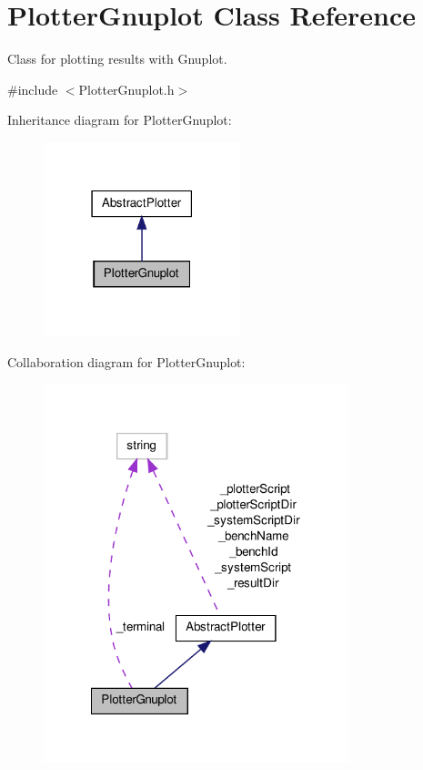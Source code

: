 \hypertarget{classPlotterGnuplot}{\section{Plotter\-Gnuplot Class Reference}
\label{classPlotterGnuplot}
}


Class for plotting results with Gnuplot.  




{\ttfamily \#include $<$Plotter\-Gnuplot.\-h$>$}



Inheritance diagram for Plotter\-Gnuplot\-:\nopagebreak
\begin{figure}[H]
\begin{center}
\leavevmode
\includegraphics[width=162pt]{classPlotterGnuplot__inherit__graph}
\end{center}
\end{figure}


Collaboration diagram for Plotter\-Gnuplot\-:\nopagebreak
\begin{figure}[H]
\begin{center}
\leavevmode
\includegraphics[width=251pt]{classPlotterGnuplot__coll__graph}
\end{center}
\end{figure}
